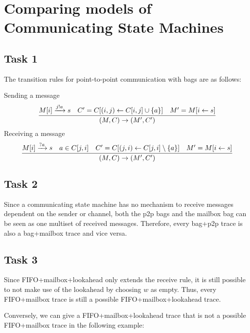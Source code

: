\section{Comparing models of Communicating State Machines}

\subsection{Task 1}
The transition rules for point-to-point communication with bags are as follows:

Sending a message
\[
\infer{(M,C) \rightarrow (M^\prime,C^\prime)}
{M[i] \xrightarrow{j!a} s & C^\prime = C[(i,j) \leftarrow C[i,j] \cup \{a\}] & 
M^\prime = M[i \leftarrow s]}
\]
Receiving a message
\[
\infer{(M,C) \rightarrow (M^\prime,C^\prime)}
{M[i] \xrightarrow{?a} s & a \in C[j,i] & C^\prime = C[(j,i) \leftarrow C[j,i] \setminus \{a\}] & M^\prime = M[i \leftarrow s]}
\]
\subsection{Task 2}
Since a communicating state machine has no mechanism to receive messages dependent on the sender or channel, both the p2p bags and the mailbox bag can be seen as one multiset of received messages. Therefore, every bag+p2p trace is also a bag+mailbox trace and vice versa. 

\subsection{Task 3}
Since FIFO+mailbox+lookahead only extends the receive rule, it is still possible to not make use of the lookahead by choosing $w$ as empty. Thus, every FIFO+mailbox trace is still a possible FIFO+mailbox+lookahead trace.

Conversely, we can give a FIFO+mailbox+lookahead trace that is not a possible FIFO+mailbox trace in the following example:


